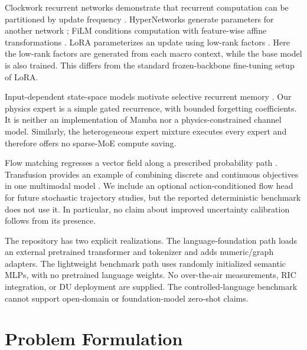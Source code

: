 \documentclass[10pt,twocolumn]{article}
\begin{document}
Clockwork recurrent networks demonstrate that recurrent computation can be
partitioned by update frequency \cite{koutnik2014}. HyperNetworks generate
parameters for another network \cite{ha2016}; FiLM conditions computation with
feature-wise affine transformations \cite{perez2018}. LoRA parameterizes an
update using low-rank factors \cite{hu2022}. Here the low-rank factors are
generated from each macro context, while the base model is also trained.
This differs from the standard frozen-backbone fine-tuning setup of LoRA.

Input-dependent state-space models motivate selective recurrent memory
\cite{gu2023}. Our physics expert is a simple gated recurrence, with bounded
forgetting coefficients. It is neither an implementation of Mamba nor a
physics-constrained channel model. Similarly, the heterogeneous expert mixture
executes every expert and therefore offers no sparse-MoE compute saving.

Flow matching regresses a vector field along a prescribed probability path
\cite{lipman2023}. Transfusion provides an example of combining discrete and
continuous objectives in one multimodal model \cite{zhou2024}. We include an
optional action-conditioned flow head for future stochastic trajectory studies,
but the reported deterministic benchmark does not use it. In particular, no
claim about improved uncertainty calibration follows from its presence.

The repository has two explicit realizations. The language-foundation path
loads an external pretrained transformer and tokenizer and adds numeric/graph
adapters. The lightweight benchmark path uses randomly initialized semantic
MLPs, with no pretrained language weights. No over-the-air measurements, RIC
integration, or DU deployment are supplied. The controlled-language benchmark
cannot support open-domain or foundation-model zero-shot claims.

\section{Problem Formulation}
\end{document}
